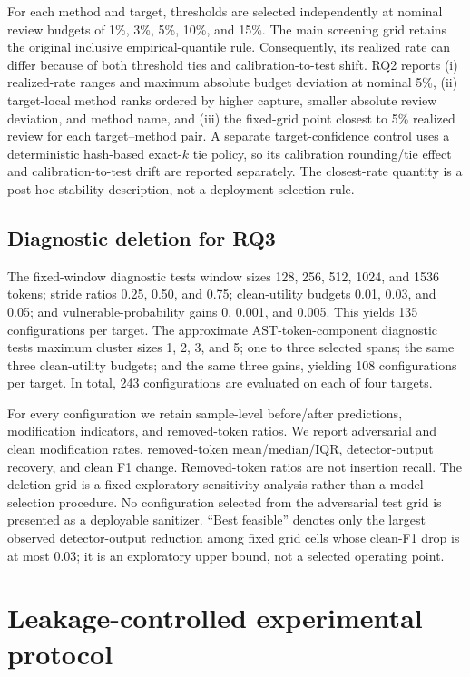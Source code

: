 \documentclass[a4paper,fleqn]{cas-dc}
\begin{document}
For each method and target, thresholds are selected independently at nominal review budgets of 1\%, 3\%, 5\%, 10\%, and 15\%. The main screening grid retains the original inclusive empirical-quantile rule. Consequently, its realized rate can differ because of both threshold ties and calibration-to-test shift. RQ2 reports (i) realized-rate ranges and maximum absolute budget deviation at nominal 5\%, (ii) target-local method ranks ordered by higher capture, smaller absolute review deviation, and method name, and (iii) the fixed-grid point closest to 5\% realized review for each target--method pair. A separate target-confidence control uses a deterministic hash-based exact-$k$ tie policy, so its calibration rounding/tie effect and calibration-to-test drift are reported separately. The closest-rate quantity is a post hoc stability description, not a deployment-selection rule.

\subsection{Diagnostic deletion for RQ3}

The fixed-window diagnostic tests window sizes 128, 256, 512, 1024, and 1536 tokens; stride ratios 0.25, 0.50, and 0.75; clean-utility budgets 0.01, 0.03, and 0.05; and vulnerable-probability gains 0, 0.001, and 0.005. This yields 135 configurations per target. The approximate AST-token-component diagnostic tests maximum cluster sizes 1, 2, 3, and 5; one to three selected spans; the same three clean-utility budgets; and the same three gains, yielding 108 configurations per target. In total, 243 configurations are evaluated on each of four targets.

For every configuration we retain sample-level before/after predictions, modification indicators, and removed-token ratios. We report adversarial and clean modification rates, removed-token mean/median/IQR, detector-output recovery, and clean F1 change. Removed-token ratios are not insertion recall. The deletion grid is a fixed exploratory sensitivity analysis rather than a model-selection procedure. No configuration selected from the adversarial test grid is presented as a deployable sanitizer. ``Best feasible'' denotes only the largest observed detector-output reduction among fixed grid cells whose clean-F1 drop is at most 0.03; it is an exploratory upper bound, not a selected operating point.

\section{Leakage-controlled experimental protocol}\label{sec:protocol}
\end{document}

